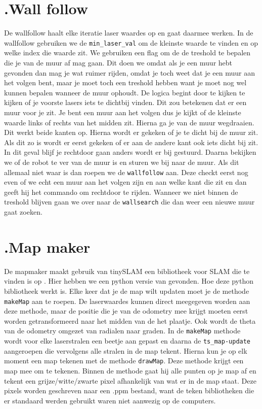 \documentclass[a4paper,10pt]{article}
\begin{document}
\section*{\label{wallfollow}\thesection.\quad Wall follow} De wallfollow haalt elke iteratie laser waardes op en gaat daarmee werken. In de wallfollow gebruiken we de \verb!min_laser_val! om de kleinste
waarde te vinden en op welke index die waarde zit. We gebruiken een flag om de
de treshold te bepalen die je van de muur af mag gaan. Dit doen we omdat als je een muur hebt gevonden dan mag je wat ruimer rijden, omdat je toch weet dat je een muur aan het volgen bent, maar je moet toch een treshold hebben want je moet nog wel kunnen bepalen wanneer de muur ophoudt. De logica begint door te kijken te kijken of je voorste lasers iets te dichtbij vinden. Dit zou betekenen dat er een muur voor je zit. Je bent een muur aan het volgen dus je kijkt of de kleinste waarde links of rechts van het midden zit. Hierna ga je van de muur wegdraaien. Dit werkt beide kanten op. Hierna wordt er gekeken of
je te dicht bij de muur zit. Als dit zo is wordt er eerst gekeken of  er aan de andere kant ook iets dicht bij zit. In dit geval blijf je rechtdoor gaan anders wordt er bij gestuurd. Daarna bekijken we of de robot te ver van de muur is en sturen we bij naar de muur. Als dit allemaal niet waar is dan roepen we de \verb!wallfollow! aan. Deze checkt eerst nog even of we echt een muur aan het volgen zijn en aan welke kant die zit en dan geeft hij het commando om rechtdoor te rijden. Wanneer we niet binnen de treshold blijven gaan we over naar de \verb!wallsearch! die dan weer een nieuwe muur gaat zoeken. 


\section*{\label{mapmaker}\thesection.\quad Map maker}
De mapmaker maakt gebruik van tinySLAM een bibliotheek voor SLAM die te vinden is op  \cite{openSLAM,CoreSLAM:article}. Hier hebben we een python versie\cite{CoreSLAM:python,} van gevonden. Hoe deze python bibliotheek werkt is. Elke keer dat je de map wilt
updaten moet je de methode \verb!makeMap! aan te roepen. De laserwaardes kunnen direct meegegeven worden aan deze methode, maar de positie die je van de
odometry mee krijgt moeten eerst worden getransformeerd naar het midden van de 
het plaatje. Ook wordt de theta van de odometry omgezet van radialen naar graden. In de \verb!makeMap! methode wordt voor elke laserstralen een beetje aan gepast en daarna de \verb!ts_map-update! aangeroepen die vervolgens
alle stralen in de map tekent. Hierna kun je op elk moment een map tekenen met
de methode \verb!drawMap!. Deze methode krijgt een map mee om te tekenen. Binnen de methode gaat hij alle punten op je map af en tekent een grijze/witte/zwarte pixel afhankelijk van wat er in de map staat. Deze pixels 
worden geschreven naar een .ppm bestand, want de teken bibliotheken die er 
standaard werden gebruikt waren niet aanwezig op de computers.
\end{document}
